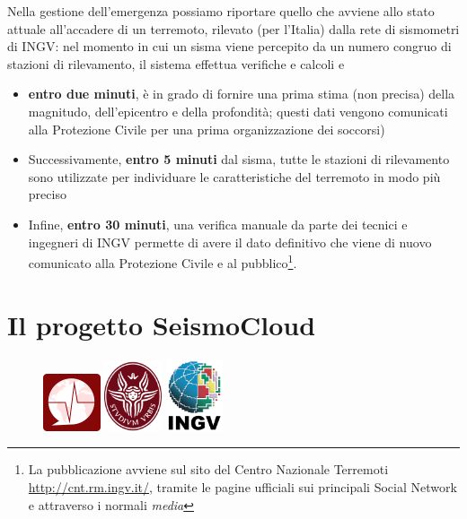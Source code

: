 \documentclass[a4paper,10pt]{memoir}
\begin{document}
Nella gestione dell'emergenza possiamo riportare quello che avviene allo stato attuale all'accadere di un terremoto, rilevato (per l'Italia) dalla rete di sismometri di INGV: nel momento in cui un sisma viene percepito da un numero congruo di stazioni di rilevamento, il sistema effettua verifiche e calcoli e
\begin{itemize}
\item \textbf{entro due minuti}, è in grado di fornire una prima stima (non precisa) della magnitudo, dell'epicentro e della profondità; questi dati vengono comunicati alla Protezione Civile per una prima organizzazione dei soccorsi)
\item Successivamente, \textbf{entro 5 minuti} dal sisma, tutte le stazioni di rilevamento sono utilizzate per individuare le caratteristiche del terremoto in modo più preciso
\item Infine, \textbf{entro 30 minuti}, una verifica manuale da parte dei tecnici e ingegneri di INGV permette di avere il dato definitivo che viene di nuovo comunicato alla Protezione Civile e al pubblico\footnote{La pubblicazione avviene sul sito del Centro Nazionale Terremoti \url{http://cnt.rm.ingv.it/}, tramite le pagine ufficiali sui principali Social Network e attraverso i normali \textit{media}}.
\end{itemize}

\pagebreak

\section{Il progetto SeismoCloud}

\begin{figure}
\centering
\label{fig:seismocloudlogos}
\includegraphics[width=0.15\textwidth]{app/seismocloud}
\includegraphics[width=0.15\textwidth]{logo-sapienza-mini}
\includegraphics[width=0.15\textwidth]{app/ingv}
\end{figure}
\end{document}
